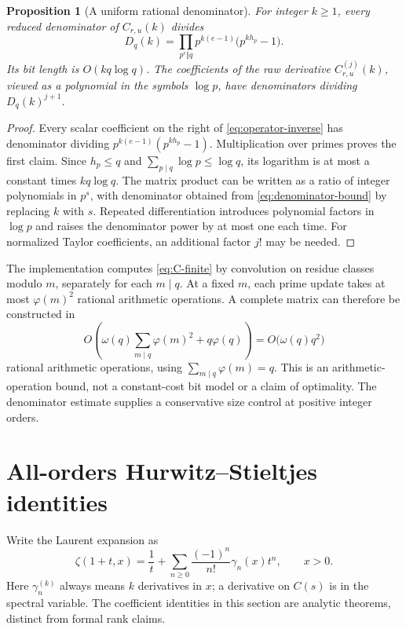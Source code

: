\documentclass[11pt]{article}
\numberwithin{equation}{section}
\newtheorem{proposition}[theorem]{Proposition}
\theoremstyle{definition}
\theoremstyle{remark}
\begin{document}
\begin{proposition}[A uniform rational denominator]\label{prop:denominator}
For integer $k\ge1$, every reduced denominator of $C_{r,u}(k)$ divides
\begin{equation}\label{eq:denominator-bound}
 D_q(k)=\prod_{p^e\Vert q}
 p^{k(e-1)}\bigl(p^{kh_p}-1\bigr).
\end{equation}
Its bit length is $O(kq\log q)$. The coefficients of the raw derivative
$C_{r,u}^{(j)}(k)$, viewed as a polynomial in the symbols $\log p$,
have denominators dividing $D_q(k)^{j+1}$.
\end{proposition}
\begin{proof}
Every scalar coefficient on the right of
\eqref{eq:operator-inverse} has denominator dividing
$p^{k(e-1)}(p^{kh_p}-1)$. Multiplication over primes proves the first
claim. Since $h_p\le q$ and $\sum_{p\mid q}\log p\le\log q$, its
logarithm is at most a constant times $kq\log q$.
The matrix product can be written as a ratio of integer polynomials in
$p^s$, with denominator obtained from \eqref{eq:denominator-bound} by
replacing $k$ with $s$. Repeated differentiation introduces polynomial
factors in $\log p$ and raises the denominator power by at most one
each time. For normalized Taylor coefficients, an additional factor
$j!$ may be needed.
\end{proof}

The implementation computes \eqref{eq:C-finite} by convolution on
residue classes modulo $m$, separately for each $m\mid q$. At a fixed
$m$, each prime update takes at most $\varphi(m)^2$ rational arithmetic
operations. A complete matrix can therefore be constructed in
\[
 O\!\left(\omega(q)\sum_{m\mid q}\varphi(m)^2+q\varphi(q)\right)
 =O\bigl(\omega(q)q^2\bigr)
\]
rational arithmetic operations, using $\sum_{m\mid q}\varphi(m)=q$.
This is an arithmetic-operation bound, not a constant-cost bit model
or a claim of optimality. The denominator estimate supplies a
conservative size control at positive integer orders.

\section{All-orders Hurwitz--Stieltjes identities}\label{sec:stieltjes}

Write the Laurent expansion as
\begin{equation}\label{eq:stieltjes-laurent}
 \zeta(1+t,x)=\frac1t+
 \sum_{n\ge0}\frac{(-1)^n}{n!}\gamma_n(x)t^n,
 \qquad x>0.
\end{equation}
Here $\gamma_n^{(k)}$ always means $k$ derivatives in $x$; a derivative
on $C(s)$ is in the spectral variable. The coefficient identities in
this section are analytic theorems, distinct from formal rank claims.
\end{document}
